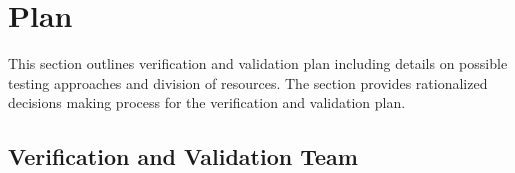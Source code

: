 \documentclass[12pt, titlepage]{article}
\begin{document}

\section{Plan}

  
This section outlines verification and validation plan including details on possible testing approaches and division of resources. The section provides rationalized decisions making process for the verification and validation plan.

\subsection{Verification and Validation Team}
\end{document}
